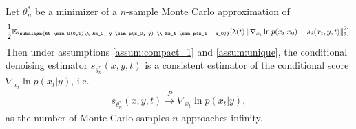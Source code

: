 \begin{customcoll}{1}
    Let $\theta_n^\ast$ be a minimizer of a $n$-sample Monte Carlo approximation of \begin{gather*}
        \begin{aligned}
                \frac{1}{2} \mathbb{E}_{\subalign{&t \sim U(0,T)\\ &x_0, y \sim p(x_0, y) \\ &x_t \sim p(x_t | x_0)}} 
                [\lambda(t) \norm{\nabla_{x_t} \ln{p(x_t | x_0)} - s_\theta(x_t, y, t)}_2^2].
        \end{aligned}
        \end{gather*} 
        Then under assumptions \ref{assum:compact_1} and \ref{assum:unique}, the conditional denoising estimator $s_{\theta_n^\ast}(x,y,t)$ is a consistent estimator of the conditional score $\nabla_{x_t} \ln p(x_t | y)$, i.e.
    \begin{gather*}
        s_{\theta_n^\ast}(x,y,t) \overset{P}{\to} \nabla_{x_t} \ln p(x_t | y),
    \end{gather*}
    as the number of Monte Carlo samples $n$ approaches infinity.
\end{customcoll}

